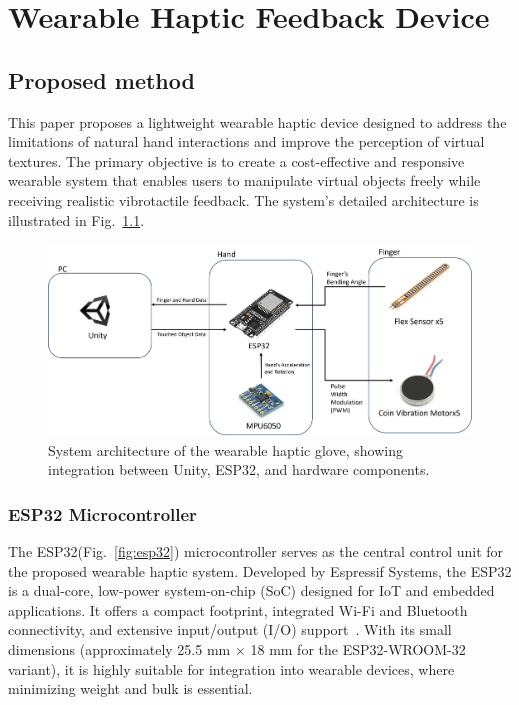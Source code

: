\chapter{Wearable Haptic Feedback Device} %

\label{Chapter3} %
\section{Proposed method}
This paper proposes a lightweight wearable haptic device designed to address the limitations of natural hand interactions and improve the perception of virtual textures. The primary objective is to create a cost-effective and responsive wearable system that enables users to manipulate virtual objects freely while receiving realistic vibrotactile feedback. The system's detailed architecture is illustrated in Fig.~\ref{fig:system_diagram}.

\begin{figure}[H]\centering
	\includegraphics[width=1\textwidth]{Pictures/system_diagram.png}%
	\caption{System architecture of the wearable haptic glove, showing integration between Unity, ESP32, and hardware components.}\label{fig:system_diagram}%
\end{figure}

\newpage
\subsection{ESP32 Microcontroller}
The ESP32(Fig.~\ref{fig:esp32}) microcontroller serves as the central control unit for the proposed wearable haptic system. Developed by Espressif Systems, the ESP32 is a dual-core, low-power system-on-chip (SoC) designed for IoT and embedded applications. It offers a compact footprint, integrated Wi-Fi and Bluetooth connectivity, and extensive input/output (I/O) support~\cite{esp32docs}. With its small dimensions (approximately 25.5 mm × 18 mm for the ESP32-WROOM-32 variant), it is highly suitable for integration into wearable devices, where minimizing weight and bulk is essential.

